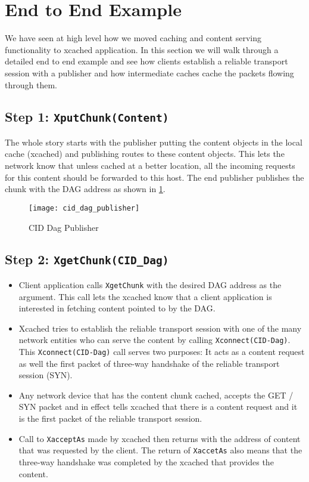 \section{End to End Example}

We have seen at high level how we moved caching and content serving
functionality to xcached application. In this section we will walk
through a detailed end to end example and see how clients establish
a reliable transport session with a publisher and how intermediate
caches cache the packets flowing through them.

\subsection{Step 1: \texttt{XputChunk(Content)}}
The whole story starts with the publisher putting the content objects
in the local cache (xcached) and publishing routes to these content
objects. This lets the network know that unless cached at a better
location, all the incoming requests for this content should be
forwarded to this host. The end publisher publishes the chunk with the
DAG address as shown in \ref{fig:cid_dag_publisher}.

\begin{figure}
  \begin{center}
    \texttt{[image: cid\_dag\_publisher]}
    \caption{CID Dag Publisher}
    \label{fig:cid_dag_publisher}
  \end{center}
\end{figure}
\subsection{Step 2: \texttt{XgetChunk(CID\_Dag)}}
\begin{itemize}
\item{Client application calls \texttt{XgetChunk} with the desired DAG
  address as the argument. This call lets the xcached know that a client
  application is interested in fetching content pointed to by the
  DAG.}
\item{Xcached tries to establish the reliable transport session with
  one of the many network entities who can serve the content by calling
  \texttt{Xconnect(CID-Dag)}. This \texttt{Xconnect(CID-Dag)} call
  serves two purposes: It acts as a content request as well the first
  packet of three-way handshake of the reliable transport session
  (SYN).}
\item{Any network device that has the content chunk cached, accepts
  the GET / SYN packet and in effect tells xcached that there is a
  content request and it is the first packet of the reliable transport
  session.}
\item{Call to \texttt{XacceptAs} made by xcached then returns with the
  address of content that was requested by the client. The return of
  \texttt{XaccetAs} also means that the three-way handshake was
  completed by the xcached that provides the content.}
\end{itemize}
